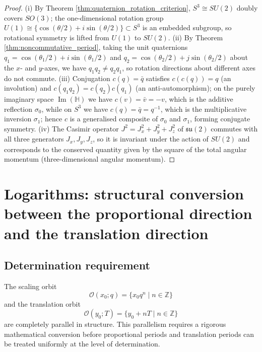 \begin{proof}
(i) By Theorem \ref{thm:quaternion_rotation_criterion}, $S^3 \cong SU(2)$ doubly covers $SO(3)$; the one-dimensional rotation group $U(1) \cong \{\cos(\theta/2) + i\sin(\theta/2)\} \subset S^3$ is an embedded subgroup, so rotational symmetry is lifted from $U(1)$ to $SU(2)$.
(ii) By Theorem \ref{thm:noncommutative_period}, taking the unit quaternions $q_1 = \cos(\theta_1/2)+i\sin(\theta_1/2)$ and $q_2 = \cos(\theta_2/2)+j\sin(\theta_2/2)$ about the $x$- and $y$-axes, we have $q_1 q_2 \neq q_2 q_1$, so rotation directions about different axes do not commute.
(iii) Conjugation $c(q) = \bar{q}$ satisfies $c(c(q)) = q$ (an involution) and $c(q_1 q_2) = c(q_2)c(q_1)$ (an anti-automorphism); on the purely imaginary space $\operatorname{Im}(\mathbb{H})$ we have $c(v) = \bar{v} = -v$, which is the additive reflection $\sigma_0$, while on $S^3$ we have $c(q) = \bar{q} = q^{-1}$, which is the multiplicative inversion $\sigma_1$; hence $c$ is a generalised composite of $\sigma_0$ and $\sigma_1$, forming conjugate symmetry.
(iv) The Casimir operator $J^2 = J_x^2 + J_y^2 + J_z^2$ of $\mathfrak{su}(2)$ commutes with all three generators $J_x,J_y,J_z$, so it is invariant under the action of $SU(2)$ and corresponds to the conserved quantity given by the square of the total angular momentum (three-dimensional angular momentum).
\end{proof}

\section{\texorpdfstring{Logarithms: structural conversion between the proportional direction and the translation direction}{Logarithms: structural conversion between the proportional direction and the translation direction}}

\subsection{\texorpdfstring{Determination requirement}{Determination requirement}}

The scaling orbit
\[
\mathcal{O}(x_0; q) = \{x_0 q^n \mid n\in\mathbb{Z}\}
\]
and the translation orbit
\[
\mathcal{O}(y_0; T) = \{y_0 + nT \mid n\in\mathbb{Z}\}
\]
are completely parallel in structure. This parallelism requires a rigorous mathematical conversion before proportional periods and translation periods can be treated uniformly at the level of determination.

